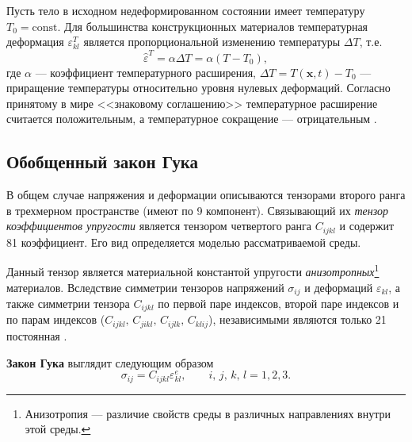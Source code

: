\documentclass[12pt, a4paper]{article}
\begin{document}
Пусть  тело в исходном недеформированном состоянии имеет температуру $T_0=\mathrm{const}$. Для большинства конструкционных материалов температурная деформация $\varepsilon_{kl}^T$ является пропорциональной изменению температуры $\Delta T$, т.е. 
\[
\hat{\varepsilon}^T = \alpha \Delta T = \alpha(T-T_0),
\]
где $\alpha$ --- коэффициент температурного расширения, $\Delta T = T(\mathbf{x},t) - T_0$ --- приращение температуры относительно уровня нулевых деформаций. Согласно принятому в мире <<знаковому соглашению>> температурное расширение считается положительным, а температурное сокращение --- отрицательным \cite{kovalenko}.

	\subsection{Обобщенный закон Гука}	
	В общем случае напряжения и деформации описываются тензорами второго ранга в трехмерном пространстве (имеют по 9 компонент). Связывающий их \textit{тензор коэффициентов упругости} является тензором четвертого ранга $C_{ijkl}$ и содержит 81 коэффициент. Его вид определяется моделью рассматриваемой среды.
	
	Данный тензор является материальной константой упругости \textit{анизотропных}\footnote{Анизотропия --- различие свойств среды в различных направлениях внутри этой среды.} материалов. Вследствие симметрии тензоров напряжений $\sigma_{ij}$ и деформаций $\varepsilon_{kl}$, а также симметрии тензора $C_{ijkl}$ по первой паре индексов, второй паре индексов и по парам индексов ($C_{ijkl},\, C_{jikl},\,C_{ijlk},\,C_{klij}$), независимыми являются только 21 постоянная \cite{timoshenko}.
	
	\textbf{Закон Гука} выглядит следующим образом
	\begin{equation}
			\sigma_{ij} = C_{ijkl} \varepsilon_{kl}^e, \qquad i,\,j,\,k,\,l = 1,2,3.
			\label{Hook}
	\end{equation}
	
\end{document}

